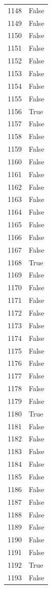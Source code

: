 \documentclass[
  letterpaper,
  DIV=11,
  numbers=noendperiod]{scrreprt}
\begin{document}
\begin{tabular}{ll}
1148 &  False \\
1149 &  False \\
1150 &  False \\
1151 &  False \\
1152 &  False \\
1153 &  False \\
1154 &  False \\
1155 &  False \\
1156 &   True \\
1157 &  False \\
1158 &  False \\
1159 &  False \\
1160 &  False \\
1161 &  False \\
1162 &  False \\
1163 &  False \\
1164 &  False \\
1165 &  False \\
1166 &  False \\
1167 &  False \\
1168 &   True \\
1169 &  False \\
1170 &  False \\
1171 &  False \\
1172 &  False \\
1173 &  False \\
1174 &  False \\
1175 &  False \\
1176 &  False \\
1177 &  False \\
1178 &  False \\
1179 &  False \\
1180 &   True \\
1181 &  False \\
1182 &  False \\
1183 &  False \\
1184 &  False \\
1185 &  False \\
1186 &  False \\
1187 &  False \\
1188 &  False \\
1189 &  False \\
1190 &  False \\
1191 &  False \\
1192 &   True \\
1193 &  False \\

\end{tabular}
\end{document}
